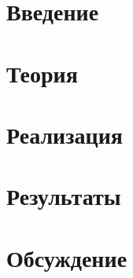 \section{Введение}


\section{Теория}


\section{Реализация}


\section{Результаты}


\section{Обсуждение}


